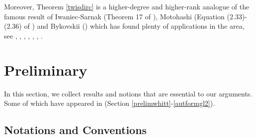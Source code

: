 \documentclass[11pt,reqno]{amsart}
\theoremstyle{definition}
\theoremstyle{definition}
\theoremstyle{remark}
\numberwithin{equation}{section}
\begin{document}
Moreover,  Theorem \ref{twisdirc} is  a higher-degree and  higher-rank analogue of the famous result of  Iwaniec-Sarnak (Theorem 17 of \cite{IS00}), Motohashi (Equation (2.33)-(2.36) of \cite{Mo92}) and  Bykovskii (\cite{By96}) which  has found plenty of applications in the area, see \cite{Mo92}, \cite{Iv01, Iv02}, \cite{J99}, \cite{Fr20}, \cite{IS00}, \cite{Liu18}, \cite{BF21}. 
 
 
 
 

 






	





 	
 	
\section{Preliminary}\label{prel}



 In this section, we  collect results and notions  that are essential to our arguments. Some of which have appeared in \cite{Kw23} (Section \ref{prelimwhitt}-\ref{autformgl2}).
 



  
  \subsection{Notations and Conventions}\label{notconv}
  
\end{document}

